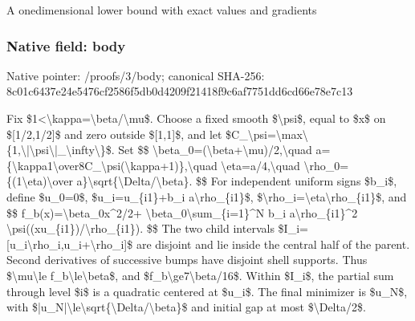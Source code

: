 \documentclass[10pt,a4paper]{article}
\begin{document}
A onedimensional lower bound with exact values and gradients


\subsubsection{Native field: body}


Native pointer: /proofs/3/body; canonical SHA-256: 8c01c6437e24e5476cf2586f\allowbreak{}5db0d4209f21418f9c6af775\allowbreak{}1dd6cd66e78e7c13


Fix \$1<\textbackslash{}kappa=\textbackslash{}beta/\textbackslash{}mu\$. Choose a fixed smooth \$\textbackslash{}psi\$, equal to \$x\$ on \$[1/2,1/2]\$ and zero outside \$[1,1]\$, and let \$C\_\textbackslash{}psi=\textbackslash{}max\textbackslash{}\{1,\textbackslash{}|\textbackslash{}psi\textbackslash{}|\_\textbackslash{}infty\textbackslash{}\}\$. Set
\$\$
\textbackslash{}beta\_0=(\textbackslash{}beta+\textbackslash{}mu)/2,\textbackslash{}quad a=\{\textbackslash{}kappa1\textbackslash{}over8C\_\textbackslash{}psi(\allowbreak{}\textbackslash{}kappa+1)\},\textbackslash{}quad
\textbackslash{}eta=a/4,\textbackslash{}quad \textbackslash{}rho\_0=\{(1\textbackslash{}eta)\textbackslash{}over a\}\textbackslash{}sqrt\{\textbackslash{}Delta/\textbackslash{}beta\}.
\$\$
For independent uniform signs \$b\_i\$, define \$u\_0=0\$,
\$u\_i=u\_\{i1\}+b\_i a\textbackslash{}rho\_\{i1\}\$, \$\textbackslash{}rho\_i=\textbackslash{}eta\textbackslash{}rho\_\{i1\}\$, and
\$\$
f\_b(x)=\textbackslash{}beta\_0x\textasciicircum{}2/2+
\textbackslash{}beta\_0\textbackslash{}sum\_\{i=1\}\textasciicircum{}N b\_i a\textbackslash{}rho\_\{i1\}\textasciicircum{}2
\textbackslash{}psi((xu\_\{i1\})/\textbackslash{}rho\_\{i1\}).
\$\$
The two child intervals \$I\_i=[u\_i\textbackslash{}rho\_i,u\_i+\textbackslash{}rho\_i]\$ are disjoint and lie inside the central half of the parent. Second derivatives of successive bumps have disjoint shell supports. Thus \$\textbackslash{}mu\textbackslash{}le f\_b\textbackslash{}le\textbackslash{}beta\$, and \$f\_b\textbackslash{}ge7\textbackslash{}beta/16\$. Within \$I\_i\$, the partial sum through level \$i\$ is a quadratic centered at \$u\_i\$. The final minimizer is \$u\_N\$, with \$|u\_N|\textbackslash{}le\textbackslash{}sqrt\{\textbackslash{}Delta/\textbackslash{}beta\}\$ and initial gap at most \$\textbackslash{}Delta/2\$.
\end{document}
